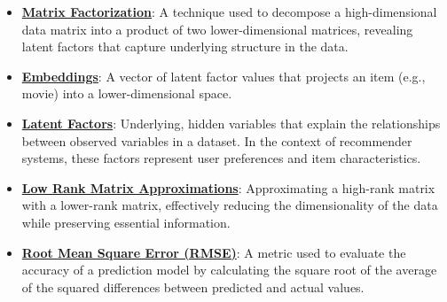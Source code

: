 \documentclass{article}%
\begin{document}
\begin{itemize}[leftmargin=*]%
\item \href{https://purdue.brightspace.com/d2l/common/assets/pdfjs-d2l-dist/1.0.14-legacy/web/viewer.html?file=\%2Fcontent\%2Fenforced\%2F1095465-WL.202510.CS24200.LE1\%2F242-19-svd-pca.pdf\%3Fou\%3D1095465\&lang=en-us\&container=d2l-fileviewer-rendered-pdf\&fullscreen=d2l-fileviewer-rendered-pdf-dialog\&height=667#page=2}{\textbf{Matrix Factorization}}: A technique used to decompose a high-dimensional data matrix into a product of two lower-dimensional matrices, revealing latent factors that capture underlying structure in the data.%
\item \href{https://purdue.brightspace.com/d2l/common/assets/pdfjs-d2l-dist/1.0.14-legacy/web/viewer.html?file=\%2Fcontent\%2Fenforced\%2F1095465-WL.202510.CS24200.LE1\%2F242-19-svd-pca.pdf\%3Fou\%3D1095465\&lang=en-us\&container=d2l-fileviewer-rendered-pdf\&fullscreen=d2l-fileviewer-rendered-pdf-dialog\&height=667#page=5}{\textbf{Embeddings}}: A vector of latent factor values that projects an item (e.g., movie) into a lower-dimensional space.%
\item \href{https://purdue.brightspace.com/d2l/common/assets/pdfjs-d2l-dist/1.0.14-legacy/web/viewer.html?file=\%2Fcontent\%2Fenforced\%2F1095465-WL.202510.CS24200.LE1\%2F242-19-svd-pca.pdf\%3Fou\%3D1095465\&lang=en-us\&container=d2l-fileviewer-rendered-pdf\&fullscreen=d2l-fileviewer-rendered-pdf-dialog\&height=667#page=3}{\textbf{Latent Factors}}: Underlying, hidden variables that explain the relationships between observed variables in a dataset. In the context of recommender systems, these factors represent user preferences and item characteristics.%
\item \href{https://purdue.brightspace.com/d2l/common/assets/pdfjs-d2l-dist/1.0.14-legacy/web/viewer.html?file=\%2Fcontent\%2Fenforced\%2F1095465-WL.202510.CS24200.LE1\%2F242-19-svd-pca.pdf\%3Fou\%3D1095465\&lang=en-us\&container=d2l-fileviewer-rendered-pdf\&fullscreen=d2l-fileviewer-rendered-pdf-dialog\&height=667#page=9}{\textbf{Low Rank Matrix Approximations}}: Approximating a high-rank matrix with a lower-rank matrix, effectively reducing the dimensionality of the data while preserving essential information.%
\item \href{https://purdue.brightspace.com/d2l/common/assets/pdfjs-d2l-dist/1.0.14-legacy/web/viewer.html?file=\%2Fcontent\%2Fenforced\%2F1095465-WL.202510.CS24200.LE1\%2F242-19-svd-pca.pdf\%3Fou\%3D1095465\&lang=en-us\&container=d2l-fileviewer-rendered-pdf\&fullscreen=d2l-fileviewer-rendered-pdf-dialog\&height=667#page=45}{\textbf{Root Mean Square Error (RMSE)}}: A metric used to evaluate the accuracy of a prediction model by calculating the square root of the average of the squared differences between predicted and actual values.%

\end{itemize}
\end{document}
